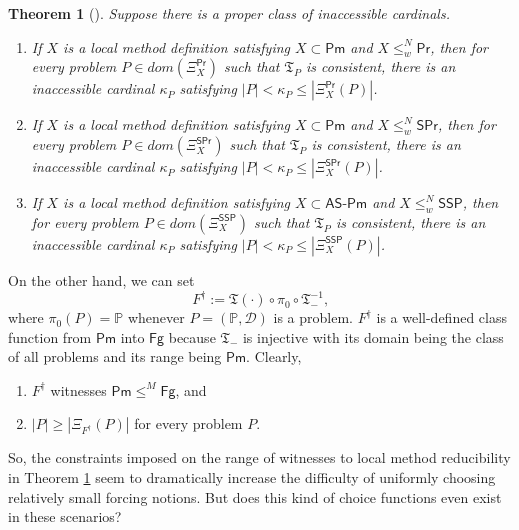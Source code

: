 \documentclass[12pt, twoside]{memoir}
\numberwithin{equation}{section}
\newtheorem{thm}{Theorem}[section]
\theoremstyle{definition}
\theoremstyle{remark}
\theoremstyle{definition}
\theoremstyle{definition}
\theoremstyle{definition}
\theoremstyle{remark}
\begin{document}
\begin{thm}[\cite{kasum}]\label{thm9525}
Suppose there is a proper class of inaccessible cardinals.  
\begin{enumerate}[label=(\arabic*)]
    \item If $X$ is a local method definition satisfying $X \subset \mathsf{Pm}$ and $X \leq^N_w \mathsf{Pr}$, then for every problem $P \in dom(\Xi^{\mathsf{Pr}}_{X})$ such that $\mathfrak{T}_P$ is consistent, there is an inaccessible cardinal $\kappa_P$ satisfying $|P| < \kappa_P \leq |\Xi^{\mathsf{Pr}}_{X}(P)|$.
    \item If $X$ is a local method definition satisfying $X \subset \mathsf{Pm}$ and $X \leq^N_w \mathsf{SPr}$, then for every problem $P \in dom(\Xi^{\mathsf{SPr}}_{X})$ such that $\mathfrak{T}_P$ is consistent, there is an inaccessible cardinal $\kappa_P$ satisfying $|P| < \kappa_P \leq |\Xi^{\mathsf{SPr}}_{X}(P)|$.
    \item If $X$ is a local method definition satisfying $X \subset \mathsf{AS\text{-}Pm}$ and $X \leq^N_w \mathsf{SSP}$, then for every problem $P \in dom(\Xi^{\mathsf{SSP}}_{X})$ such that $\mathfrak{T}_P$ is consistent, there is an inaccessible cardinal $\kappa_P$ satisfying $|P| < \kappa_P \leq |\Xi^{\mathsf{SSP}}_{X}(P)|$.
\end{enumerate}
\end{thm}

On the other hand, we can set 
\begin{equation*}
    F^{\dagger} := \mathfrak{T}(\cdot) \circ \pi_0 \circ \mathfrak{T}_{-}^{-1} \text{,}
\end{equation*}
where $\pi_0(P) = \mathbb{P}$ whenever $P = (\mathbb{P}, \mathcal{D})$ is a problem. $F^{\dagger}$ is a well-defined class function from $\mathsf{Pm}$ into $\mathsf{Fg}$ because $\mathfrak{T}_{-}$ is injective with its domain being the class of all problems and its range being $\mathsf{Pm}$. Clearly,
\begin{enumerate}[label=(\Alph*)$_{F^{\dagger}}$,leftmargin=40pt]
    \item\label{SA} $F^{\dagger}$ witnesses $\mathsf{Pm} \leq^M \mathsf{Fg}$, and
    \item\label{SB} $|P| \geq |\Xi_{F^{\dagger}}(P)|$ for every problem $P$.
\end{enumerate}
So, the constraints imposed on the range of witnesses to local method reducibility in Theorem \ref{thm9525} seem to dramatically increase the difficulty of uniformly choosing relatively small forcing notions. But does this kind of choice functions even exist in these scenarios?
\end{document}
